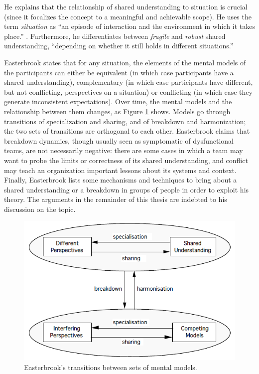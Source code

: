 He explains that the relationship of shared understanding to situation is crucial (since it focalizes the concept to a meaningful and achievable scope). He uses the term \emph{situation} as ``an episode of interaction and the environment in which it takes place.'' \cite{Cody1985}. Furthermore, he differentiates between \emph{fragile} and \emph{robust} shared understanding, ``depending on whether it still holds in different situations.''

Easterbrook states that for any situation, the elements of the mental models of the participants can either be equivalent (in which case participants have a shared understanding), complementary (in which case participants have different, but not conflicting, perspectives on a situation) or conflicting (in which case they generate inconsistent expectations). Over time, the mental models and the relationship between them changes, as Figure \ref{EasterbrookSUDynamicsFig} shows. Models go through transitions of specialization and sharing, and of breakdown and harmonization; the two sets of transitions are orthogonal to each other. Easterbrook claims that breakdown dynamics, though usually seen as symptomatic of dysfunctional teams, are not necessarily negative: there are some cases in which a team may want to probe the limits or correctness of its shared understanding, and conflict may teach an organization important lessons about its systems and context. Finally, Easterbrook lists some mechanisms and techniques to bring about a shared understanding or a breakdown in groups of people in order to exploit his theory. The arguments in the remainder of this thesis are indebted to his discussion on the topic.

\begin{figure}[tb]
\centering
\includegraphics[scale=0.7]{sme-su}
\caption{\label{EasterbrookSUDynamicsFig}Easterbrook's transitions between sets of mental models.}
\end{figure}



